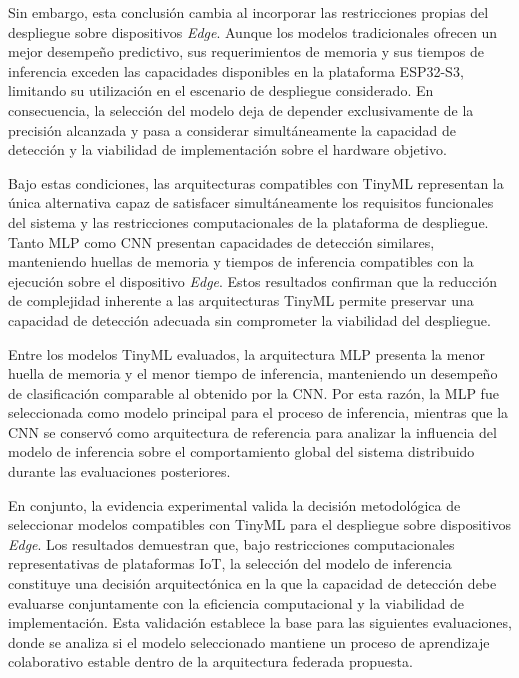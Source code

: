 \documentclass[journal,article,submit,moreauthors]{Definitions/mdpi}
\begin{document}
Sin embargo, esta conclusión cambia al incorporar las restricciones propias del despliegue sobre dispositivos \textit{Edge}. Aunque los modelos tradicionales ofrecen un mejor desempeño predictivo, sus requerimientos de memoria y sus tiempos de inferencia exceden las capacidades disponibles en la plataforma ESP32-S3, limitando su utilización en el escenario de despliegue considerado. En consecuencia, la selección del modelo deja de depender exclusivamente de la precisión alcanzada y pasa a considerar simultáneamente la capacidad de detección y la viabilidad de implementación sobre el hardware objetivo.

Bajo estas condiciones, las arquitecturas compatibles con TinyML representan la única alternativa capaz de satisfacer simultáneamente los requisitos funcionales del sistema y las restricciones computacionales de la plataforma de despliegue. Tanto MLP como CNN presentan capacidades de detección similares, manteniendo huellas de memoria y tiempos de inferencia compatibles con la ejecución sobre el dispositivo \textit{Edge}. Estos resultados confirman que la reducción de complejidad inherente a las arquitecturas TinyML permite preservar una capacidad de detección adecuada sin comprometer la viabilidad del despliegue.

Entre los modelos TinyML evaluados, la arquitectura MLP presenta la menor huella de memoria y el menor tiempo de inferencia, manteniendo un desempeño de clasificación comparable al obtenido por la CNN. Por esta razón, la MLP fue seleccionada como modelo principal para el proceso de inferencia, mientras que la CNN se conservó como arquitectura de referencia para analizar la influencia del modelo de inferencia sobre el comportamiento global del sistema distribuido durante las evaluaciones posteriores.

En conjunto, la evidencia experimental valida la decisión metodológica de seleccionar modelos compatibles con TinyML para el despliegue sobre dispositivos \textit{Edge}. Los resultados demuestran que, bajo restricciones computacionales representativas de plataformas IoT, la selección del modelo de inferencia constituye una decisión arquitectónica en la que la capacidad de detección debe evaluarse conjuntamente con la eficiencia computacional y la viabilidad de implementación. Esta validación establece la base para las siguientes evaluaciones, donde se analiza si el modelo seleccionado mantiene un proceso de aprendizaje colaborativo estable dentro de la arquitectura federada propuesta.
\end{document}
